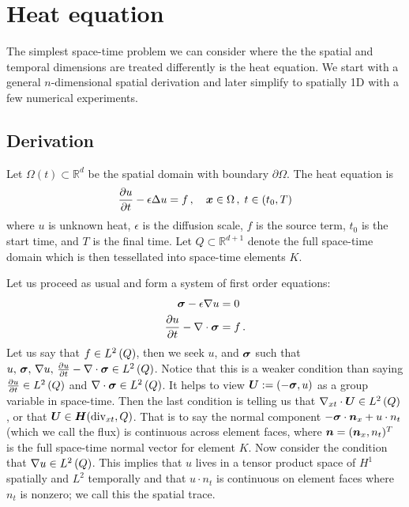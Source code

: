 \documentclass[Proposal.tex]{subfiles}
\begin{document}
\section{Heat equation}
The simplest space-time problem we can consider where the the spatial and temporal dimensions are treated differently is the heat equation.
We start with a general $n$-dimensional spatial derivation and later simplify to spatially 1D with a few numerical experiments.

\subsection{Derivation}
Let $\Omega(t)\subset\mathbb{R}^d$ be the spatial domain with boundary $\partial\Omega$.
The heat equation is
\begin{equation}
	\frac{\partial u}{\partial t}-\epsilon\Delta u=f\,,\quad\boldsymbol x\in\Omega\,,\;t\in(t_0,T)
\end{equation}
where $u$ is unknown heat, $\epsilon$ is the diffusion scale, $f$ is the source term, $t_0$ is the start time, and $T$ is the final time.
Let $Q\subset\mathbb{R}^{d+1}$ denote the full space-time domain which is then tessellated into space-time elements $K$.

Let us proceed as usual and form a system of first order equations:
\begin{equation}
\label{eq:heatFirstOrder}
\begin{aligned}
\boldsymbol\sigma-\epsilon\nabla u&=0\\
\frac{\partial u}{\partial t}-\nabla\cdot\boldsymbol\sigma&=f\,.
\end{aligned}
\end{equation}
Let us say that $f\in L^2\left( Q \right)$, then we seek $u$, and $\boldsymbol\sigma$ such that $u,\,\boldsymbol\sigma,\,\nabla u,\,\frac{\partial u}{\partial t}-\nabla\cdot\boldsymbol\sigma\in L^2\left( Q \right)$.
Notice that this is a weaker condition than saying $\frac{\partial u}{\partial t}\in L^2\left( Q \right)$ and $\nabla\cdot\boldsymbol\sigma\in L^2\left( Q \right)$.
It helps to view $\boldsymbol U:=(-\boldsymbol\sigma, u)$ as a group variable in space-time. 
Then the last condition is telling us that $\nabla_{xt}\cdot\boldsymbol U\in L^2\left( Q \right)$, or that $\boldsymbol U\in\mbox{\boldmath $H$}(\text{div}_{xt},Q)$.
That is to say the normal component $-\boldsymbol\sigma\cdot\boldsymbol n_x+u\cdot n_t$ (which we call the flux) is continuous across element faces, 
where $\boldsymbol n=(\boldsymbol n_x,n_t)^T$ is the full space-time normal vector for element $K$.
Now consider the condition that $\nabla u\in L^2\left( Q \right)$.
This implies that $u$ lives in a tensor product space of $H^1$ spatially and $L^2$ temporally and that
$u\cdot n_t$ is continuous on element faces where $n_t$ is nonzero; we call this the spatial trace.
\end{document}
